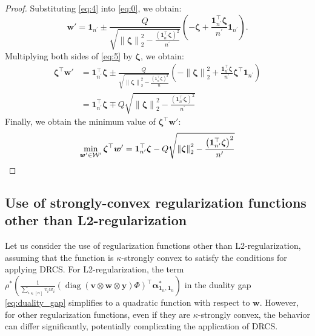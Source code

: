 \begin{proof}
	Substituting \eqref{eq:4} into \eqref{eq:0}, we obtain:
	\begin{equation}
		\bm w' = \bm 1_{n ^\prime} \pm \frac{Q}{\sqrt{\left\|\bm\zeta\right\|_2^2 - \displaystyle\frac{\left(\bm 1_{n ^\prime}^\top \bm\zeta\right)^2}{n ^\prime}}} \left(- \bm\zeta + \frac{\bm 1_{n ^\prime}^\top \bm\zeta}{n ^\prime}\bm 1_{n ^\prime}\right). \label{eq:5}
	\end{equation}
	Multiplying both sides of \eqref{eq:5} by $\bm \zeta$, we obtain:
	\begin{align}
		\bm\zeta^\top \bm w' & = \bm 1_{n ^\prime}^\top \bm\zeta \pm \frac{Q}{\sqrt{\left\|\bm\zeta\right\|_2^2 - \displaystyle\frac{\left(\bm 1_{n ^\prime}^\top \bm\zeta\right)^2}{n ^\prime}}} \left(- \left\|\bm\zeta\right\|_2^2 + \frac{\bm 1_{n ^\prime}^\top \bm\zeta}{n ^\prime}\bm\zeta^\top \bm 1_{n ^\prime}\right) \nonumber\\
		& = \bm 1_{n ^\prime} ^\top \bm\zeta \mp Q \sqrt{\left\|\bm\zeta\right\|_2^2 - \displaystyle\frac{\left(\bm 1_{n ^\prime}^\top \bm\zeta\right)^2}{n ^\prime}}
	\end{align}
	Finally, we obtain the minimum value of $\bm\zeta^\top \bm w'$:
	\begin{align}
		\min_{\bm w' \in {\cal W'}} \bm\zeta^\top \bm w' = \bm 1_{n ^\prime} ^\top \bm\zeta - Q \sqrt{\left\|\bm\zeta\right\|_2^2 - \displaystyle\frac{\left(\bm 1_{n ^\prime}^\top \bm\zeta\right)^2}{n ^\prime}} \nonumber
	\end{align}
\end{proof}

\subsection{Use of strongly-convex regularization functions other than L2-regularization} \label{app:regularization-functions}

Let us consider the use of regularization functions other than L2-regularization, assuming that the function is $\kappa$-strongly convex to satisfy the conditions for applying DRCS. For L2-regularization, the term
$\rho^*\left(\frac{1}{\sum_{i\in[n]} v_i w_i}(\operatorname{diag}(\bm v\otimes\bm w \otimes \bm y) \Phi)^\top\bm\alpha_{\bm 1_n, \bm 1_n}^{*} \right)$
in the duality gap \eqref{eq:duality_gap} simplifies to a quadratic function with respect to $\bm w$. However, for other regularization functions, even if they are $\kappa$-strongly convex, the behavior can differ significantly, potentially complicating the application of DRCS.

